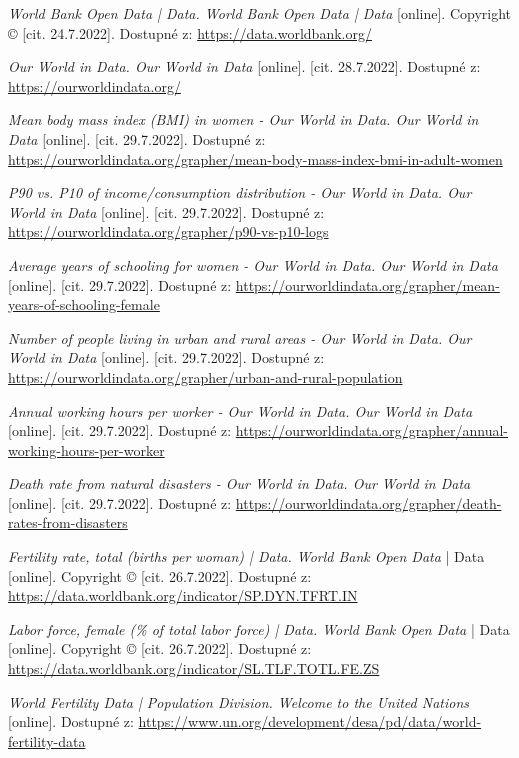 \documentclass[thesis=M,czech]{FITthesis}[2022/10/08]
\begin{document}
\begin{thebibliography}{99}
 \textit{World Bank Open Data | Data. World Bank Open Data | Data} [online]. Copyright © [cit. 24.7.2022]. Dostupné z: \url{https://data.worldbank.org/}

 \textit{Our World in Data. Our World in Data} [online]. [cit. 28.7.2022]. Dostupné z: \url{https://ourworldindata.org/}

 \textit{Mean body mass index (BMI) in women - Our World in Data. Our World in Data} [online]. [cit. 29.7.2022]. Dostupné z: \url{https://ourworldindata.org/grapher/mean-body-mass-index-bmi-in-adult-women}

 \textit{P90 vs. P10 of income/consumption distribution - Our World in Data. Our World in Data} [online]. [cit. 29.7.2022]. Dostupné z: \url{https://ourworldindata.org/grapher/p90-vs-p10-logs}

 \textit{Average years of schooling for women - Our World in Data. Our World in Data} [online]. [cit. 29.7.2022]. Dostupné z: \url{https://ourworldindata.org/grapher/mean-years-of-schooling-female}

 \textit{Number of people living in urban and rural areas - Our World in Data. Our World in Data} [online]. [cit. 29.7.2022]. Dostupné z: \url{https://ourworldindata.org/grapher/urban-and-rural-population}

 \textit{Annual working hours per worker - Our World in Data. Our World in Data} [online]. [cit. 29.7.2022]. Dostupné z: \url{https://ourworldindata.org/grapher/annual-working-hours-per-worker}

 \textit{Death rate from natural disasters - Our World in Data. Our World in Data} [online]. [cit. 29.7.2022]. Dostupné z: \url{https://ourworldindata.org/grapher/death-rates-from-disasters}

 \textit{Fertility rate, total (births per woman) | Data. World Bank Open Data} | Data [online]. Copyright © [cit. 26.7.2022]. Dostupné z: \url{https://data.worldbank.org/indicator/SP.DYN.TFRT.IN}

 \textit{Labor force, female (\% of total labor force) | Data. World Bank Open Data} | Data [online]. Copyright © [cit. 26.7.2022]. Dostupné z: \url{https://data.worldbank.org/indicator/SL.TLF.TOTL.FE.ZS}

 \textit{World Fertility Data | Population Division. Welcome to the United Nations} [online]. Dostupné z: \url{https://www.un.org/development/desa/pd/data/world-fertility-data}


\end{thebibliography}
\end{document}
